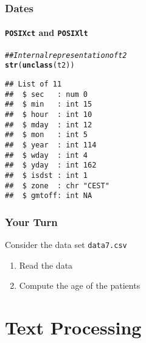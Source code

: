 \documentclass[paper=screen,mathserif]{beamer}\usepackage[]{graphicx}\usepackage[]{color}
\makeatletter
\newcommand{\hlcom}[1]{\textcolor[rgb]{0.678,0.584,0.686}{\textit{#1}}}%
\newcommand{\hlstd}[1]{\textcolor[rgb]{0.345,0.345,0.345}{#1}}%
\newcommand{\hlkwd}[1]{\textcolor[rgb]{0.737,0.353,0.396}{\textbf{#1}}}%
\newenvironment{kframe}{%
 \def\at@end@of@kframe{}%
 \ifinner\ifhmode%
  \def\at@end@of@kframe{\end{minipage}}%
  \begin{minipage}{\columnwidth}%
 \fi\fi%
 \def\FrameCommand##1{\hskip\@totalleftmargin \hskip-\fboxsep
 \colorbox{shadecolor}{##1}\hskip-\fboxsep
     \hskip-\linewidth \hskip-\@totalleftmargin \hskip\columnwidth}%
 \MakeFramed {\advance\hsize-\width
   \@totalleftmargin\z@ \linewidth\hsize
   \@setminipage}}%
 {\par\unskip\endMakeFramed%
 \at@end@of@kframe}
\newenvironment{knitrout}{}{} %
\newcommand{\ft}[1]{\frametitle{#1}}
\newcommand{\fst}[1]{\framesubtitle{#1}}
\makeatother
\begin{document}
\begin{frame}[fragile]
  \ft{Dates}
  \fst{{\tt POSIXct} and {\tt POSIXlt}}
\begin{knitrout}\scriptsize
{}\color{fgcolor}\begin{kframe}
\begin{alltt}
\hlcom{## Internal representation of t2}
\hlkwd{str}\hlstd{(}\hlkwd{unclass}\hlstd{(t2))}
\end{alltt}
\begin{verbatim}
## List of 11
##  $ sec   : num 0
##  $ min   : int 15
##  $ hour  : int 10
##  $ mday  : int 12
##  $ mon   : int 5
##  $ year  : int 114
##  $ wday  : int 4
##  $ yday  : int 162
##  $ isdst : int 1
##  $ zone  : chr "CEST"
##  $ gmtoff: int NA
\end{verbatim}
\end{kframe}
\end{knitrout}
\end{frame}

\begin{frame}[fragile]
  \ft{Your Turn}
  
  Consider the data set {\tt data7.csv}
  \begin{enumerate}
  \item Read the data
  \item Compute the age of the patients
  \end{enumerate}

  
\end{frame}

\section{Text Processing}
\end{document}
